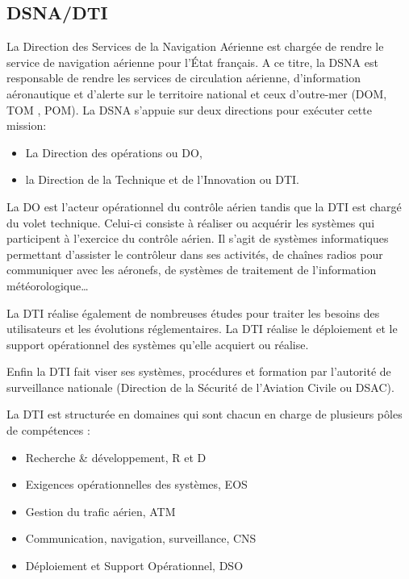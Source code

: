     \subsection{DSNA/DTI}
La Direction des Services de la Navigation Aérienne est chargée de rendre le service de navigation aérienne pour l’État français. A ce titre, la DSNA est responsable de rendre les services de circulation aérienne, d’information aéronautique et d’alerte sur le territoire national et ceux d’outre-mer (DOM, TOM , POM). La DSNA s’appuie sur deux directions pour exécuter cette mission:
\begin{itemize}
  \item La Direction des opérations ou DO,
  \item la Direction de la Technique et de l’Innovation ou DTI.
\end{itemize}
La DO est l’acteur opérationnel du contrôle aérien tandis que la DTI est chargé du volet technique. Celui-ci consiste à réaliser ou acquérir les systèmes qui participent à l’exercice du contrôle aérien. Il s’agit de systèmes informatiques permettant d’assister le contrôleur dans ses activités, de chaînes radios pour communiquer avec les aéronefs, de systèmes de traitement de l’information météorologique…

La DTI réalise également de nombreuses études pour traiter les besoins des utilisateurs et les évolutions réglementaires. La DTI réalise le déploiement et le support opérationnel des systèmes qu’elle acquiert ou réalise. 

Enfin la DTI fait viser ses systèmes, procédures et formation par l’autorité de surveillance nationale (Direction de la Sécurité de l'Aviation Civile ou DSAC).

La DTI est structurée en domaines qui sont chacun en charge de plusieurs pôles de compétences :
\begin{itemize}
  \item Recherche \& développement, R et D
  \item Exigences opérationnelles des systèmes, EOS
  \item Gestion du trafic aérien, ATM
  \item Communication, navigation, surveillance, CNS
  \item Déploiement et Support Opérationnel, DSO
\end{itemize}

